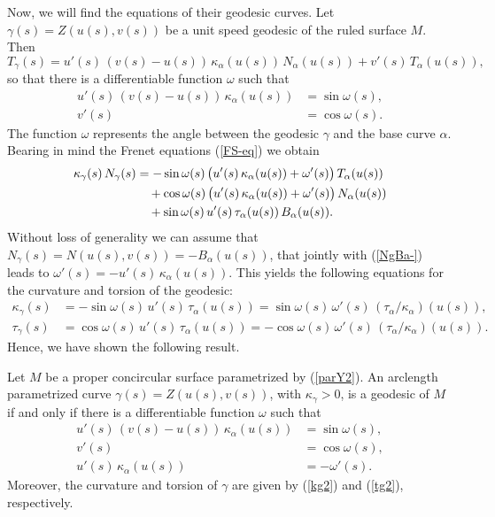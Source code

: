\documentclass[eqnumis, pdf]{hjms}
\def\Y{Z}
\begin{document}
Now, we will find the equations of their geodesic curves. Let $\gamma(s)=\Y(u(s),v(s))$ be a unit speed geodesic of the ruled surface $M$. Then
\[
T_\gamma(s)=u'(s)\,(v(s)-u(s))\,\kappa_\alpha(u(s))\,N_\alpha(u(s))+v'(s)\,T_\alpha(u(s)),
\]
so that there is a differentiable function $\omega$ such that
\begin{align*}
u'(s)\,(v(s)-u(s))\,\kappa_\alpha(u(s)) &= \sin\omega(s),\\
v'(s) &= \cos\omega(s).
\end{align*}
The function $\omega$ represents the angle between the geodesic $\gamma$ and the base curve $\alpha$. Bearing in mind the Frenet equations (\ref{FS-eq}) we obtain
\begin{align}
\kappa_\gamma(s)\,N_\gamma(s) &= -\sin\omega(s)\,\big(u'(s)\,\kappa_\alpha(u(s))+\omega'(s)\big)\,T_\alpha(u(s))\nonumber\\
&\kern10pt +\cos\omega(s)\,\big(u'(s)\,\kappa_\alpha(u(s))+\omega'(s)\big)\,N_\alpha(u(s))\nonumber\\
&\kern10pt +\sin\omega(s)\,u'(s)\,\tau_\alpha(u(s))\,B_\alpha(u(s)).\label{NgBa-}
\end{align}
Without loss of generality we can assume that
$N_\gamma(s)=N(u(s),v(s))=-B_\alpha(u(s))$,
that jointly with (\ref{NgBa-}) leads to
\(
\omega'(s) = -u'(s)\,\kappa_\alpha(u(s)).
\)
This yields the following equations for the curvature and torsion of the geodesic:
\begin{align}
\kappa_\gamma(s) &= -\sin\omega(s)\,u'(s)\,\tau_\alpha(u(s))= \sin\omega(s)\,\omega'(s)\,(\tau_\alpha/\kappa_\alpha)(u(s)),\label{kg2}\\
\tau_\gamma(s) &= \cos\omega(s)\,u'(s)\,\tau_\alpha(u(s))= -\cos\omega(s)\,\omega'(s)\,(\tau_\alpha/\kappa_\alpha)(u(s)).\label{tg2}
\end{align}
Hence, we have shown the following result.
\begin{proposition}\label{p3}
Let $M$ be a proper concircular surface parametrized by (\ref{parY2}). An arclength parametrized curve $\gamma(s)=\Y(u(s),v(s))$, with $\kappa_\gamma>0$, is a geodesic of $M$ if and only if there is a differentiable function $\omega$ such that
\begin{align}
u'(s)\,(v(s)-u(s))\,\kappa_\alpha(u(s)) &= \sin\omega(s),\label{p2.1}\\
v'(s) &= \cos\omega(s),\label{p2.2}\\
u'(s)\,\kappa_\alpha(u(s)) &= -\omega'(s).\label{p2.3}
\end{align}
Moreover, the curvature and torsion of $\gamma$ are given by (\ref{kg2}) and (\ref{tg2}), respectively.
\end{proposition}
\end{document}

